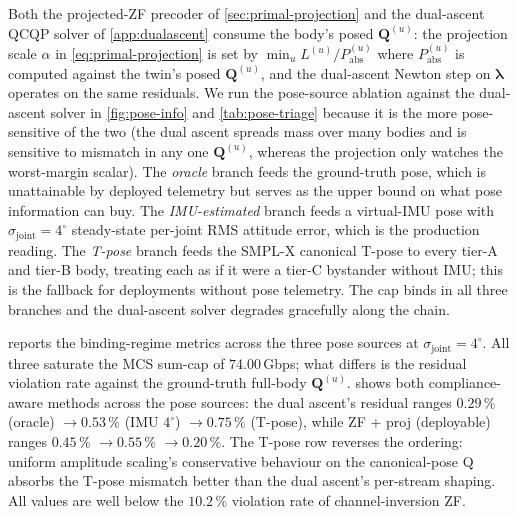 \documentclass[journal,twocolumn,10pt]{IEEEtran}
\theoremstyle{plain}
\theoremstyle{remark}
\newcommand{\Pabs}{P_{\mathrm{abs}}}
\newcommand{\Qmat}{\mathbf{Q}}
\begin{document}
Both the projected-ZF precoder of \cref{sec:primal-projection} and
the dual-ascent QCQP solver of \cref{app:dualascent} consume the
body's posed $\Qmat^{(u)}$: the projection scale $\alpha$ in
\cref{eq:primal-projection} is set by
$\min_u L^{(u)}/\Pabs^{(u)}$ where $\Pabs^{(u)}$ is computed against
the twin's posed $\Qmat^{(u)}$, and the dual-ascent Newton step on
$\bm\lambda$ operates on the same residuals. We run the
pose-source ablation against the dual-ascent solver in
\cref{fig:pose-info} and \cref{tab:pose-triage} because it is the
more pose-sensitive of the two (the dual ascent spreads mass over
many bodies and is sensitive to mismatch in any one $\Qmat^{(u)}$,
whereas the projection only watches the worst-margin scalar). The
\emph{oracle} branch feeds the ground-truth pose, which is
unattainable by deployed telemetry but serves as the upper bound
on what pose information can buy. The \emph{IMU-estimated} branch
feeds a virtual-IMU pose with $\sigma_{\mathrm{joint}} = 4^\circ$
steady-state per-joint RMS attitude error, which is the production
reading. The \emph{T-pose} branch feeds the SMPL-X canonical T-pose
to every tier-A and tier-B body, treating each as if it were a
tier-C bystander without IMU; this is the fallback for
deployments without pose telemetry. The cap binds in all three
branches and the dual-ascent solver degrades gracefully along the
chain.

 reports the binding-regime metrics across
the three pose sources at $\sigma_{\mathrm{joint}} = 4^\circ$. All
three saturate the MCS sum-cap of $74.00\,$Gbps; what differs is
the residual violation rate against the ground-truth full-body
$\Qmat^{(u)}$.  shows both compliance-aware
methods across the pose sources: the dual ascent's residual
ranges $0.29\,\%$ (oracle) $\to 0.53\,\%$ (IMU $4^\circ$)
$\to 0.75\,\%$ (T-pose), while ZF + proj (deployable) ranges
$0.45\,\%$ $\to 0.55\,\%$ $\to 0.20\,\%$. The T-pose row reverses
the ordering: uniform amplitude scaling's conservative behaviour
on the canonical-pose Q absorbs the T-pose mismatch better than
the dual ascent's per-stream shaping. All values are well below
the $10.2\,\%$ violation rate of channel-inversion ZF.
\end{document}
